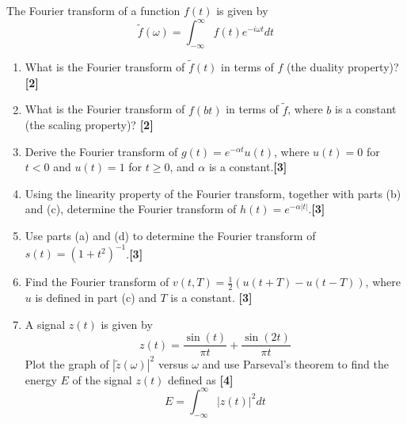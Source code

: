 \documentclass[a4paper]{article}
\begin{document}
\begin{qns}
The Fourier transform of a function $f(t)$ is given by
$$\tilde{f}(\omega)=\int_{-\infty}^\infty f(t)e^{-i\omega t}dt$$
\begin{enumerate}[label=(\alph*)]
\item What is the Fourier transform of $\tilde{f}(t)$ in terms of $f$ (the duality property)?\hfill\textbf{[2]}
\item What is the Fourier transform of $f(bt)$ in terms of $\tilde{f}$, where $b$ is a constant (the scaling property)? \hfill\textbf{[2]}
\item Derive the Fourier transform of $g(t) = e^{-\alpha t}u(t)$, where $u(t) = 0$ for $t< 0$ and $u(t) = 1$ for $t\geq 0$, and $\alpha$ is a constant.\hfill\textbf{[3]}
\item Using the linearity property of the Fourier transform, together with parts (b) and (c), determine the Fourier transform of $h(t)=e^{-\alpha|t|}$.\hfill\textbf{[3]}
\item Use parts (a) and (d) to determine the Fourier transform of $s(t) = (1 + t^2)^{−1}$.\hfill\textbf{[3]}
\item Find the Fourier transform of $v(t, T) = \frac{1}{2} (u(t + T) − u(t − T))$, where $u$ is defined in part (c) and $T$ is a constant. \hfill\textbf{[3]}
\item A signal $z(t)$ is given by
$$z(t)=\frac{\sin(t)}{\pi t}+\frac{\sin(2t)}{\pi t}$$
Plot the graph of $|\tilde{z}(\omega)|^2$ versus $\omega$ and use Parseval’s theorem to find the energy $E$ of the signal $z(t)$ defined as \hfill\textbf{[4]}
$$E=\int_{-\infty}^\infty |z(t)|^2dt$$
\end{enumerate}
\end{qns}
\end{document}
